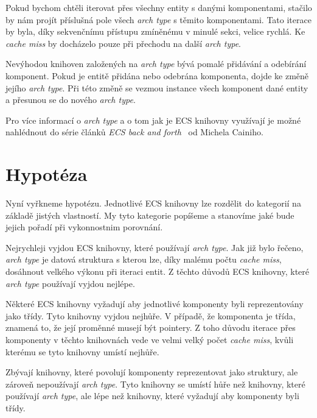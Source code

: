 Pokud bychom chtěli iterovat přes všechny entity s danými komponentami, stačilo by nám projít příslušná pole všech \textit{arch type} s těmito komponentami. Tato iterace by byla, díky sekvenčnímu přístupu zmíněnému v minulé sekci, velice rychlá. Ke \textit{cache miss} by docházelo pouze při přechodu na další \textit{arch type}.

Nevýhodou knihoven založených na \textit{arch type} bývá pomalé přidávání a odebírání komponent. Pokud je entitě přidána nebo odebrána komponenta, dojde ke změně jejího \textit{arch type}. Při této změně se vezmou instance všech komponent dané entity a přesunou se do nového \textit{arch type}.

Pro více informací o \textit{arch type} a o tom jak je ECS knihovny využívají je možné nahlédnout do série článků \textit{ECS back and forth}~\cite{Caini_2019} od Michela Cainiho.

\section{Hypotéza}
Nyní vyřkneme hypotézu. Jednotlivé ECS knihovny lze rozdělit do kategorií na základě jistých vlastností. My tyto kategorie popíšeme a stanovíme jaké bude jejich pořadí při vykonnostnim porovnání.

Nejrychleji vyjdou ECS knihovny, které používají \textit{arch type}. Jak již bylo řečeno, \textit{arch type} je datová struktura s kterou lze, díky malému počtu \textit{cache miss}, dosáhnout velkého výkonu při iteraci entit. Z těchto důvodů ECS knihovny, které \textit{arch type} používají vyjdou nejlépe.

Některé ECS knihovny vyžadují aby jednotlivé komponenty byli reprezentovány jako třídy. Tyto knihovny vyjdou nejhůře. V případě, že komponenta je třída, znamená to, že její proměnné musejí být pointery. Z toho důvodu iterace přes komponenty v těchto knihovnách vede ve velmi velký počet \textit{cache miss}, kvůli kterému se tyto knihovny umístí nejhůře. 

Zbývají knihovny, které povolují komponenty reprezentovat jako struktury, ale zároveň nepoužívají \textit{arch type}. Tyto knihovny se umístí hůře než knihovny, které používají \textit{arch type}, ale lépe než knihovny, které vyžadují aby komponenty byli třídy.